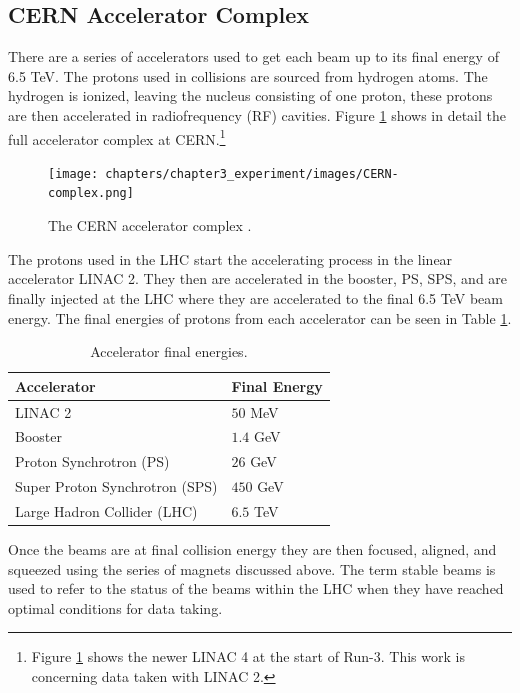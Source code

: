 	\subsection{CERN Accelerator Complex}\label{ssec:cern-accelerators}
		There are a series of accelerators used to get each beam up to its final energy of 6.5 TeV. The protons used in collisions are sourced from hydrogen atoms. The hydrogen is ionized, leaving the nucleus consisting of one proton, these protons are then accelerated in radiofrequency (RF) cavities. Figure \ref{fig:CERN-complex} shows in detail the full accelerator complex at CERN.\footnote{Figure \ref{fig:CERN-complex} shows the newer LINAC 4 at the start of Run-3. This work is concerning data taken with LINAC 2.} 
		\begin{figure}[!ht]
		\centering
		\texttt{[image: chapters/chapter3\_experiment/images/CERN-complex.png]}
		\caption{The CERN accelerator complex \cite{CERN-complex}.}
		\label{fig:CERN-complex}
		\end{figure}
		The protons used in the \gls{LHC} start the accelerating process in the linear accelerator LINAC 2. They then are accelerated in the booster, PS, SPS, and are finally injected at the \gls{LHC} where they are accelerated to the final 6.5 TeV beam energy. The final energies of protons from each accelerator can be seen in Table \ref{tab:accelerator-complex}.
		\begin{table}[!thp]
			\centering
			\caption{Accelerator final energies.}
			\begin{tabular}{| l | l |}  
			\hline
			Accelerator 					& Final Energy 	\\ \hline
			\hline
			LINAC 2 						& $50$ MeV 		\\ 	\hline
			Booster 						& $1.4$ GeV 	\\ 	\hline
			Proton Synchrotron (PS)			& $26$ GeV 		\\ 	\hline
			Super Proton Synchrotron (SPS) 	& $450$ GeV 	\\ 	\hline
			Large Hadron Collider (LHC)		& $6.5$ TeV 	\\ 	\hline
			\end{tabular}
			\label{tab:accelerator-complex}
		\end{table}
		Once the beams are at final collision energy they are then focused, aligned, and squeezed using the series of magnets discussed above. The term stable beams is used to refer to the status of the beams within the LHC when they have reached optimal conditions for data taking.

